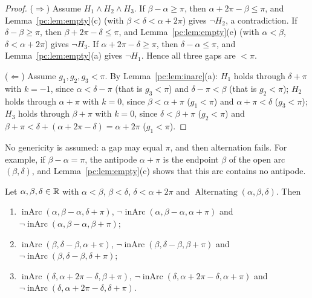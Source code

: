\begin{proof}
($\Rightarrow$) Assume $H_1\wedge H_2\wedge H_3$. If $\beta-\alpha\ge\pi$, then $\alpha+2\pi-\beta\le\pi$, and
Lemma~\ref{pc:lem:empty}(c) (with $\beta<\delta<\alpha+2\pi$) gives $\neg H_2$, a contradiction. If
$\delta-\beta\ge\pi$, then $\beta+2\pi-\delta\le\pi$, and Lemma~\ref{pc:lem:empty}(e) (with $\alpha<\beta$,
$\delta<\alpha+2\pi$) gives $\neg H_3$. If $\alpha+2\pi-\delta\ge\pi$, then $\delta-\alpha\le\pi$, and
Lemma~\ref{pc:lem:empty}(a) gives $\neg H_1$. Hence all three gaps are $<\pi$.

($\Leftarrow$) Assume $g_1,g_2,g_3<\pi$. By Lemma~\ref{pc:lem:inarc}(a):
$H_1$ holds through $\delta+\pi$ with $k=-1$, since $\alpha<\delta-\pi$ (that is $g_3<\pi$) and $\delta-\pi<\beta$
(that is $g_2<\pi$);
$H_2$ holds through $\alpha+\pi$ with $k=0$, since $\beta<\alpha+\pi$ ($g_1<\pi$) and $\alpha+\pi<\delta$
($g_3<\pi$);
$H_3$ holds through $\beta+\pi$ with $k=0$, since $\delta<\beta+\pi$ ($g_2<\pi$) and
$\beta+\pi<\delta+(\alpha+2\pi-\delta)=\alpha+2\pi$ ($g_1<\pi$).
\end{proof}

\begin{remark}\label{pc:rem:alt-boundary}
No genericity is assumed: a gap may equal $\pi$, and then alternation fails. For example, if $\beta-\alpha=\pi$,
the antipode $\alpha+\pi$ is the endpoint $\beta$ of the open arc $(\beta,\delta)$, and
Lemma~\ref{pc:lem:empty}(c) shows that this arc contains no antipode.
\end{remark}

\begin{proposition}\label{pc:prop:exactly-one}
Let $\alpha,\beta,\delta\in\mathbb R$ with $\alpha<\beta$, $\beta<\delta$, $\delta<\alpha+2\pi$ and
$\operatorname{Alternating}(\alpha,\beta,\delta)$. Then
\begin{enumerate}[label=(\roman*)]
\item $\operatorname{inArc}(\alpha,\beta-\alpha,\delta+\pi)$, $\neg\operatorname{inArc}(\alpha,\beta-\alpha,\alpha+\pi)$ and
  $\neg\operatorname{inArc}(\alpha,\beta-\alpha,\beta+\pi)$;
\item $\operatorname{inArc}(\beta,\delta-\beta,\alpha+\pi)$, $\neg\operatorname{inArc}(\beta,\delta-\beta,\beta+\pi)$ and
  $\neg\operatorname{inArc}(\beta,\delta-\beta,\delta+\pi)$;
\item $\operatorname{inArc}(\delta,\alpha+2\pi-\delta,\beta+\pi)$,
  $\neg\operatorname{inArc}(\delta,\alpha+2\pi-\delta,\alpha+\pi)$ and
  $\neg\operatorname{inArc}(\delta,\alpha+2\pi-\delta,\delta+\pi)$.
\end{enumerate}
\end{proposition}

